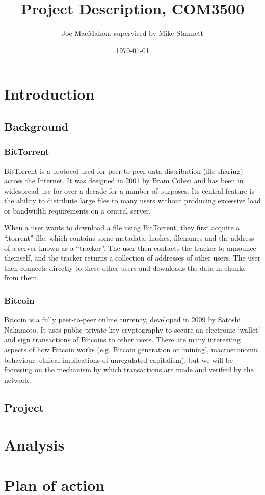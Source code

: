 \documentclass{article}
\title{Project Description, COM3500}
\author{Joe MacMahon, supervised by Mike Stannett}
\date{\today}
\begin{document}
\maketitle

\section{Introduction}
\subsection{Background}
\subsubsection{BitTorrent}
BitTorrent is a protocol used for peer-to-peer data distribution (file sharing) across the Internet.  It was designed in 2001 by Bram Cohen and has been in widespread use for over a decade for a number of purposes.  Its central feature is the ability to distribute large files to many users without producing excessive load or bandwidth requirements on a central server.

When a user wants to download a file using BitTorrent, they first acquire a ``.torrent'' file, which contains some metadata: hashes, filenames and the address of a server known as a ``tracker''.  The user then contacts the tracker to announce themself, and the tracker returns a collection of addresses of other users.  The user then connects directly to these other users and downloads the data in chunks from them.


\subsubsection{Bitcoin}
Bitcoin is a fully peer-to-peer online currency, developed in 2009 by Satoshi Nakamoto.  It uses public-private key cryptography to secure an electronic `wallet' and sign transactions of Bitcoins to other users.  There are many interesting aspects of how Bitcoin works (e.g. Bitcoin generation or `mining', macroeconomic behaviour, ethical implications of unregulated capitalism), but we will be focussing on the mechanism by which transactions are made and verified by the network.


\subsection{Project}

\section{Analysis}

\section{Plan of action}
\end{document}
